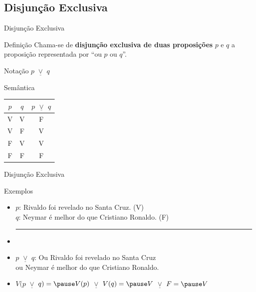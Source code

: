 \documentclass[xcolor=dvipsnames,table]{beamer}
\begin{document}
	\subsection{Disjunção Exclusiva}
	\begin{frame}{Disjunção Exclusiva}
		\begin{block}{Definição}
			Chama-se de {\bf disjunção exclusiva de duas proposições} $p$ e $q$ a proposição representada por ``ou $p$ ou $q$''.
		\end{block} \pause
		\begin{block}{Notação}
			$p$ $\underline{\vee}$ $q$
		\end{block} \pause
		\begin{block}{Semântica}
			\begin{center}
				\begin{tabular}{|cc|c|}
					\hline
					$p$	&	$q$	&	$p$ $\underline{\vee}$ $q$	\\
					\hline
					V	&	V	&	F	\\
					V	&	F	&	V	\\
					F	&	V	&	V	\\
					F	&	F	&	F	\\
					\hline
				\end{tabular}
			\end{center}
		\end{block}
	\end{frame}

	\begin{frame}{Disjunção Exclusiva}
		\begin{block}{Exemplos}
			\begin{itemize}
				\item $p$: Rivaldo foi revelado no Santa Cruz. \hspace*{0.9cm} (V)\\
				$q$: Neymar é melhor do que Cristiano Ronaldo. \hspace*{0.9cm} (F)\\
				\hrule
				\item \pause
				\item $p$ $\underline{\vee}$ $q$: Ou Rivaldo foi revelado no Santa Cruz \\
				\hspace*{1.1cm} ou Neymar é melhor do que Cristiano Ronaldo.\\ \pause
				\vspace*{0.3cm}
				\item $V(p$ $\underline\vee$ $q) = \pause V(p)$ $\underline\vee$ $V(q) = \pause V$ $\underline\vee$ $F = \pause V$
			\end{itemize}
		\end{block}
\end{frame}
\end{document}
